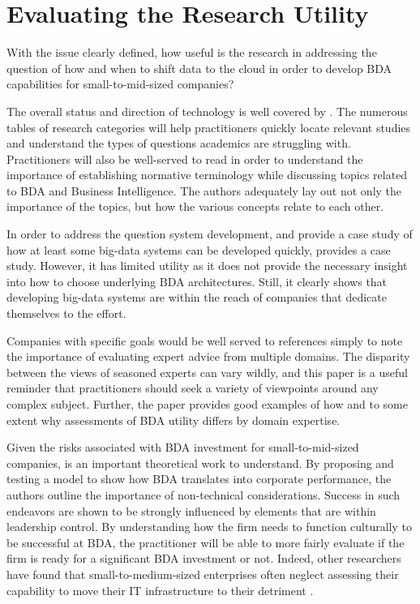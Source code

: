 \section{Evaluating the Research Utility}

With the issue clearly defined, how useful is the research in addressing the question of how and when to shift data to the cloud in order to develop BDA capabilities for small-to-mid-sized companies?

The overall status and direction of technology is well covered by \textcite{shengTechnology21stCentury2019}. The numerous tables of research categories will help practitioners quickly locate relevant studies and understand the types of questions academics are struggling with. Practitioners will also be well-served to read \textcite{lopez-robles30YearsIntelligence2019} in order to understand the importance of establishing normative terminology while discussing topics related to BDA and Business Intelligence. The authors adequately lay out not only the importance of the topics, but how the various concepts relate to each other.

In order to address the question system development, and provide a case study of how at least some big-data systems can be developed quickly, \textcite{jiModelingImageVideo2019} provides a  case study. However, it has limited utility as it does not provide the necessary insight into how to choose underlying BDA architectures. Still, it clearly shows that developing big-data systems are within the reach of companies that dedicate themselves to the effort.

Companies with specific goals would be well served to references \textcite{rossmannFutureSocialImpact2018} simply to note the importance of evaluating expert advice from multiple domains. The disparity between the views of seasoned experts can vary wildly, and this paper is a useful reminder that practitioners should seek a variety of viewpoints around any complex subject. Further, the paper provides good examples of how and to some extent why assessments of BDA utility differs by domain expertise.

Given the risks associated with BDA investment for small-to-mid-sized companies, \textcite{bozicBusinessIntelligenceAnalytics2019} is an important theoretical work to understand. By proposing and testing a model to show how BDA translates into corporate performance, the authors outline the importance of non-technical considerations. Success in such endeavors are shown to be strongly influenced by elements that are within leadership control. By understanding how the firm needs to function culturally to be successful at BDA, the practitioner will be able to more fairly evaluate if the firm is ready for a significant BDA investment or not. Indeed, other researchers have found that small-to-medium-sized enterprises often neglect assessing their capability to move their IT infrastructure to their detriment \parencite{carcaryAdoptionCloudComputing2014}.

